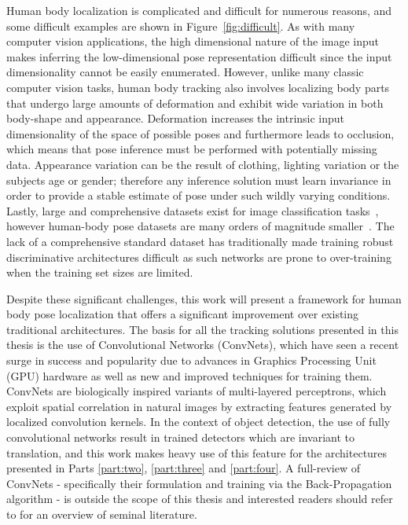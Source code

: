 Human body localization is complicated and difficult for numerous reasons, and
some difficult examples are shown in Figure~\ref{fig:difficult}. As with many
computer vision applications, the high dimensional nature of the image input
makes inferring the low-dimensional pose representation difficult since the
input dimensionality cannot be easily enumerated. However, unlike many classic
computer vision tasks, human body tracking also involves localizing body parts
that undergo large amounts of deformation and exhibit wide variation in both
body-shape and appearance. Deformation increases the intrinsic input
dimensionality of the space of possible poses and furthermore leads to
occlusion, which means that pose inference must be performed with potentially
missing data. Appearance variation can be the result of clothing, lighting
variation or the subjects age or gender; therefore any inference solution must
learn invariance in order to provide a stable estimate of pose under such
wildly varying conditions. Lastly, large and comprehensive datasets exist for
image classification tasks~\cite{deng2009imagenet}, however human-body pose
datasets are many orders of magnitude
smaller~\cite{modec,andriluka14cvpr,Johnson10}. The lack of a comprehensive
standard dataset has traditionally made training robust discriminative
architectures difficult as such networks are prone to over-training when the
training set sizes are limited.

Despite these significant challenges, this work will present a framework for
human body pose localization that offers a significant improvement over
existing traditional architectures. The basis for all the tracking solutions
presented in this thesis is the use of Convolutional Networks (ConvNets), which
have seen a recent surge in success and popularity due to advances in Graphics
Processing Unit (GPU) hardware as well as new and improved techniques for
training them. ConvNets are biologically inspired variants of multi-layered
perceptrons, which exploit spatial correlation in natural images by extracting
features generated by localized convolution kernels. In the context of object
detection, the use of fully convolutional networks result in trained detectors
which are invariant to translation, and this work makes heavy use of this
feature for the architectures presented in Parts \ref{part:two},
\ref{part:three} and \ref{part:four}. A full-review of ConvNets - specifically
their formulation and training via the Back-Propagation algorithm - is outside
the scope of this thesis and interested readers should refer to
\cite{reading_list} for an overview of seminal literature.

